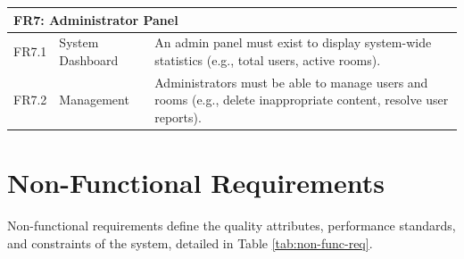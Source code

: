 \begin{longtable}{l l p{9cm}}
\multicolumn{3}{l}{\textbf{FR7: Administrator Panel}} \\
\midrule
FR7.1 & System Dashboard & An admin panel must exist to display system-wide statistics (e.g., total users, active rooms). \\
FR7.2 & Management & Administrators must be able to manage users and rooms (e.g., delete inappropriate content, resolve user reports). \\

\end{longtable}


\section{Non-Functional Requirements}
\label{sec:non-func-req}
Non-functional requirements define the quality attributes, performance standards, and constraints of the system, detailed in Table \ref{tab:non-func-req}.

